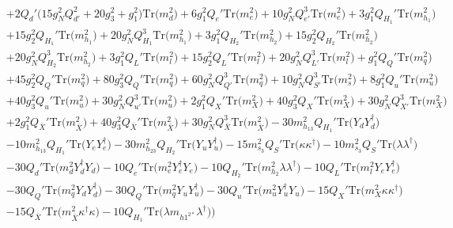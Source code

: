 \begin{align}
 &+2 Q_d' \Big(15 g_{N}^{2} Q_{d'}^{2}  + 20 g_{3}^{2}  + g_{1}^{2}\Big)\mbox{Tr}\Big({m_d^2}\Big) +6 g_{1}^{2} Q_e' \mbox{Tr}\Big({m_e^2}\Big) +10 g_{N}^{2} Q_{e'}^{3} \mbox{Tr}\Big({m_e^2}\Big) +3 g_{1}^{2} Q_{H_1}' \mbox{Tr}\Big({m_{h_1}^2}\Big) \nonumber \\ 
 &+15 g_{2}^{2} Q_{H_1}' \mbox{Tr}\Big({m_{h_1}^2}\Big) +20 g_{N}^{2} Q_{H_1}^{3} \mbox{Tr}\Big({m_{h_1}^2}\Big) +3 g_{1}^{2} Q_{H_2}' \mbox{Tr}\Big({m_{h_2}^2}\Big) +15 g_{2}^{2} Q_{H_2}' \mbox{Tr}\Big({m_{h_2}^2}\Big) \nonumber \\ 
 &+20 g_{N}^{2} Q_{H_2}^{3} \mbox{Tr}\Big({m_{h_2}^2}\Big) +3 g_{1}^{2} Q_L' \mbox{Tr}\Big({m_l^2}\Big) +15 g_{2}^{2} Q_L' \mbox{Tr}\Big({m_l^2}\Big) +20 g_{N}^{2} Q_{L'}^{3} \mbox{Tr}\Big({m_l^2}\Big) +g_{1}^{2} Q_Q' \mbox{Tr}\Big({m_q^2}\Big) \nonumber \\ 
 &+45 g_{2}^{2} Q_Q' \mbox{Tr}\Big({m_q^2}\Big) +80 g_{3}^{2} Q_Q' \mbox{Tr}\Big({m_q^2}\Big) +60 g_{N}^{2} Q_{Q'}^{3} \mbox{Tr}\Big({m_q^2}\Big) +10 g_{N}^{2} Q_{S'}^{3} \mbox{Tr}\Big({m_{s}^2}\Big) +8 g_{1}^{2} Q_u' \mbox{Tr}\Big({m_u^2}\Big) \nonumber \\ 
 &+40 g_{3}^{2} Q_u' \mbox{Tr}\Big({m_u^2}\Big) +30 g_{N}^{2} Q_{u'}^{3} \mbox{Tr}\Big({m_u^2}\Big) +2 g_{1}^{2} Q_X' \mbox{Tr}\Big({m_{X}^2}\Big) +40 g_{3}^{2} Q_X' \mbox{Tr}\Big({m_{X}^2}\Big) +30 g_{N}^{2} Q_{X'}^{3} \mbox{Tr}\Big({m_{X}^2}\Big) \nonumber \\ 
 &+2 g_{1}^{2} Q_{\bar{X}}' \mbox{Tr}\Big({m_{\bar{X}}^2}\Big) +40 g_{3}^{2} Q_{\bar{X}}' \mbox{Tr}\Big({m_{\bar{X}}^2}\Big) +30 g_{N}^{2} Q_{\bar{X}}^{3} \mbox{Tr}\Big({m_{\bar{X}}^2}\Big) -30 m_{h_{13}}^2 Q_{H_1}' \mbox{Tr}\Big({Y_d  Y_{d}^{\dagger}}\Big) \nonumber \\ 
 &-10 m_{h_{13}}^2 Q_{H_1}' \mbox{Tr}\Big({Y_e  Y_{e}^{\dagger}}\Big) -30 m_{h_{23}}^2 Q_{H_2}' \mbox{Tr}\Big({Y_u  Y_{u}^{\dagger}}\Big) -15 m_{s_3}^2 Q_S' \mbox{Tr}\Big({\kappa  \kappa^{\dagger}}\Big) -10 m_{s_3}^2 Q_S' \mbox{Tr}\Big({\lambda  \lambda^{\dagger}}\Big) \nonumber \\ 
 &-30 Q_d' \mbox{Tr}\Big({m_d^2  Y_{d}^{\dagger}  Y_d}\Big) -10 Q_e' \mbox{Tr}\Big({m_e^2  Y_{e}^{\dagger}  Y_e}\Big) -10 Q_{H_2}' \mbox{Tr}\Big({m_{h_2}^2  \lambda  \lambda^{\dagger}}\Big) -10 Q_L' \mbox{Tr}\Big({m_l^2  Y_e  Y_{e}^{\dagger}}\Big) \nonumber \\ 
 &-30 Q_Q' \mbox{Tr}\Big({m_q^2  Y_d  Y_{d}^{\dagger}}\Big) -30 Q_Q' \mbox{Tr}\Big({m_q^2  Y_u  Y_{u}^{\dagger}}\Big) -30 Q_u' \mbox{Tr}\Big({m_u^2  Y_{u}^{\dagger}  Y_u}\Big) -15 Q_X' \mbox{Tr}\Big({m_{X}^2  \kappa  \kappa^{\dagger}}\Big) \nonumber \\ 
 &-15 Q_{\bar{X}}' \mbox{Tr}\Big({m_{\bar{X}}^2  \kappa^{\dagger}  \kappa}\Big) -10 Q_{H_1}' \mbox{Tr}\Big({\lambda  m_{{h 1}^{2 *}}  \lambda^{\dagger}}\Big) \Big)
\end{align} 

